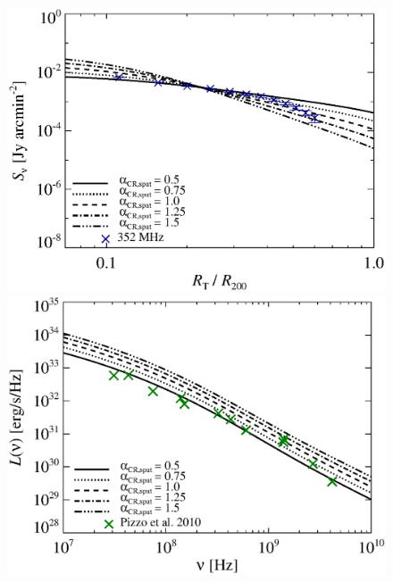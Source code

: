 \documentclass[a4paper,fleqn,usenatbib]{mnras}
\newcommand{\Mflatturb}{{\it M-turbulence}\xspace}
\begin{document}
\begin{figure}
\begin{minipage}{1\columnwidth}
\begin{center}
   \end{center}
\end{minipage}
\\
\begin{minipage}{1\columnwidth}
  \begin{center}%
    \includegraphics[width=\columnwidth]{prof.comp.KrTTDth.aCR.eps}
  \end{center}
\end{minipage}
\begin{minipage}{1\columnwidth}
   \begin{center}%
     \includegraphics[width=\columnwidth]{spec.comp.KrTTDth.aCR.eps}

\end{center}
\end{minipage}
\end{figure}
\end{document}
